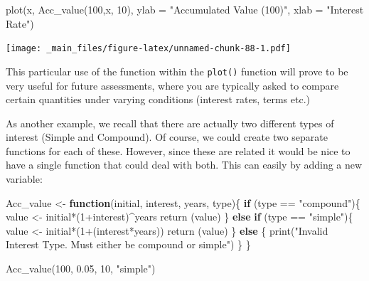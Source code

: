 \documentclass[
]{book}
\newenvironment{Shaded}{\begin{snugshade}}{\end{snugshade}}
\newcommand{\AttributeTok}[1]{\textcolor[rgb]{0.77,0.63,0.00}{#1}}
\newcommand{\ControlFlowTok}[1]{\textcolor[rgb]{0.13,0.29,0.53}{\textbf{#1}}}
\newcommand{\DecValTok}[1]{\textcolor[rgb]{0.00,0.00,0.81}{#1}}
\newcommand{\FloatTok}[1]{\textcolor[rgb]{0.00,0.00,0.81}{#1}}
\newcommand{\FunctionTok}[1]{\textcolor[rgb]{0.00,0.00,0.00}{#1}}
\newcommand{\NormalTok}[1]{#1}
\newcommand{\OtherTok}[1]{\textcolor[rgb]{0.56,0.35,0.01}{#1}}
\newcommand{\SpecialCharTok}[1]{\textcolor[rgb]{0.00,0.00,0.00}{#1}}
\newcommand{\StringTok}[1]{\textcolor[rgb]{0.31,0.60,0.02}{#1}}
\theoremstyle{definition}
\theoremstyle{definition}
\theoremstyle{definition}
\theoremstyle{definition}
\theoremstyle{remark}
\begin{document}
\begin{Shaded}
\begin{Highlighting}[]
\FunctionTok{plot}\NormalTok{(x, }\FunctionTok{Acc\_value}\NormalTok{(}\DecValTok{100}\NormalTok{,x, }\DecValTok{10}\NormalTok{), }\AttributeTok{ylab =} \StringTok{"Accumulated Value (100)"}\NormalTok{, }\AttributeTok{xlab =} \StringTok{"Interest Rate"}\NormalTok{)}
\end{Highlighting}
\end{Shaded}

\texttt{[image: \_main\_files/figure-latex/unnamed-chunk-88-1.pdf]}

This particular use of the function within the \texttt{plot()} function will prove to be very useful for future assessments, where you are typically asked to compare certain quantities under varying conditions (interest rates, terms etc.)

As another example, we recall that there are actually two different types of interest (Simple and Compound). Of course, we could create two separate functions for each of these. However, since these are related it would be nice to have a single function that could deal with both. This can easily by adding a new variable:

\begin{Shaded}
\begin{Highlighting}[]
\NormalTok{Acc\_value }\OtherTok{\textless{}{-}} \ControlFlowTok{function}\NormalTok{(initial, interest, years, type)\{}
  \ControlFlowTok{if}\NormalTok{ (type }\SpecialCharTok{==} \StringTok{"compound"}\NormalTok{)\{}
\NormalTok{  value }\OtherTok{\textless{}{-}}\NormalTok{ initial}\SpecialCharTok{*}\NormalTok{(}\DecValTok{1}\SpecialCharTok{+}\NormalTok{interest)}\SpecialCharTok{\^{}}\NormalTok{years}
  \FunctionTok{return}\NormalTok{ (value)}
\NormalTok{  \} }\ControlFlowTok{else} \ControlFlowTok{if}\NormalTok{ (type }\SpecialCharTok{==} \StringTok{"simple"}\NormalTok{)\{}
\NormalTok{    value }\OtherTok{\textless{}{-}}\NormalTok{ initial}\SpecialCharTok{*}\NormalTok{(}\DecValTok{1}\SpecialCharTok{+}\NormalTok{(interest}\SpecialCharTok{*}\NormalTok{years))}
    \FunctionTok{return}\NormalTok{ (value)}
\NormalTok{  \} }\ControlFlowTok{else}\NormalTok{ \{}
    \FunctionTok{print}\NormalTok{(}\StringTok{"Invalid Interest Type. Must either be \textquotesingle{}compound\textquotesingle{} or \textquotesingle{}simple\textquotesingle{}"}\NormalTok{)}
\NormalTok{  \}}
\NormalTok{\}}

\FunctionTok{Acc\_value}\NormalTok{(}\DecValTok{100}\NormalTok{, }\FloatTok{0.05}\NormalTok{, }\DecValTok{10}\NormalTok{, }\StringTok{"simple"}\NormalTok{)}
\end{Highlighting}
\end{Shaded}
\end{document}
